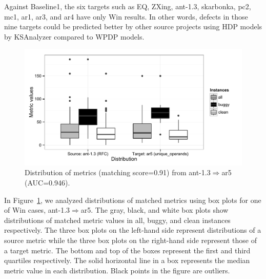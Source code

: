 
Against Baseline1, the six targets such as EQ, ZXing, ant-1.3, skarbonka, pc2, 
mc1, ar1, ar3, and ar4 have only Win results. In other words, defects in those nine targets
could be predicted better by other source projects using HDP models by
KSAnalyzer compared to WPDP models.

\label{sec:why}
\begin{figure}[t]
	\centering
	\includegraphics[width=\linewidth]{Figures/Result/best_dist_bplot.pdf}
	\caption{Distribution of metrics (matching score=0.91)
	from ant-1.3$\Rightarrow$ar5 (AUC=0.946).}
	\label{fig:best_dist}
\end{figure}

In Figure~\ref{fig:best_dist}, we analyzed distributions of matched metrics using box plots for one of Win cases, ant-1.3$\Rightarrow$ar5. 
The gray, black, and white box plots show distributions of matched metric values in
all, buggy, and clean instances respectively. The three box plots on the
left-hand side represent distributions of a source metric while the three
box plots on the right-hand side represent those of a target metric. The
bottom and top of the boxes represent the first and third quartiles
respectively.
The solid horizontal line in a box represents the median metric value in each distribution. 
Black points in the figure are outliers.

